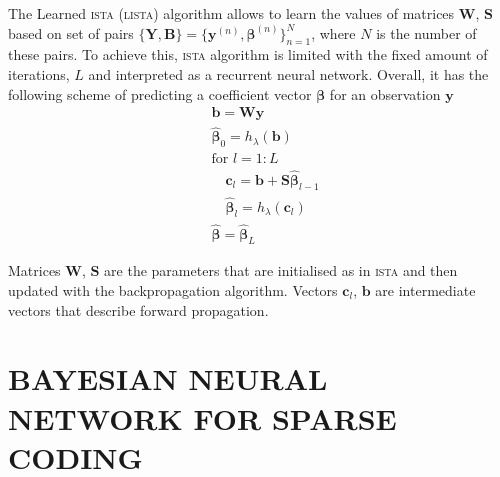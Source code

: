 \documentclass[letterpaper]{article}
\begin{document}
The Learned \textsc{ista} (\textsc{lista}) \citep{gregor2010learning} algorithm allows to learn the values of matrices $\mathbf{W}$, $\mathbf{S}$ based on set of pairs $\{\mathbf{Y}, \mathbf{B}\}=\{\mathbf{y}^{(n)}, \boldsymbol\beta^{(n)}\}_{n=1}^N$, where $N$ is the number of these pairs. To achieve this, \textsc{ista} algorithm is limited with the fixed amount of iterations, $L$ and interpreted as a recurrent neural network. Overall, it has the following scheme of predicting a coefficient vector $\boldsymbol\beta$ for an observation $\mathbf{y}$
\begin{align}
\label{eq:first_layer}
&\mathbf{b} = \mathbf{W}\mathbf{y}\\
\label{eq:thr_first}
&\widehat{\boldsymbol\beta}_0 = h_\lambda(\mathbf{b}) \\
&\text{for } l=1:L\\
\label{eq:l_dense_layer}
	&\quad \mathbf{c}_l = \mathbf{b} + \mathbf{S}\widehat{\boldsymbol\beta}_{l-1} \\
\label{eq:l_thr}
	&\quad \widehat{\boldsymbol\beta}_{l} = h_\lambda(\mathbf{c}_l) \\
& \widehat{\boldsymbol\beta} = \widehat{\boldsymbol\beta}_{L}
\end{align}

Matrices $\mathbf{W}$, $\mathbf{S}$ are the parameters that are initialised as in \textsc{ista} and then updated with the backpropagation algorithm. Vectors $\mathbf{c}_l$, $\mathbf{b}$ are intermediate vectors that describe forward propagation.

\section{\uppercase{Bayesian neural network for sparse coding}}
\label{sec:bayesian_lista}
\end{document}
